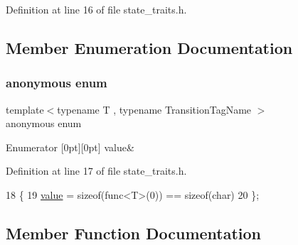 Definition at line 16 of file state\+\_\+traits.\+h.



\subsection{Member Enumeration Documentation}
\mbox{\label{classsmacc_1_1HasSpecificNamedOnExit_aff1a587a8d216597d2dd5b208affc8d0}} 
\subsubsection{\texorpdfstring{anonymous enum}{anonymous enum}}
{\footnotesize\ttfamily template$<$typename T , typename Transition\+Tag\+Name $>$ \\
anonymous enum}

\begin{DoxyEnumFields}{Enumerator}
[0pt][0pt]{}\mbox{\label{classsmacc_1_1HasSpecificNamedOnExit_aff1a587a8d216597d2dd5b208affc8d0a37b1f8de55f442fbc24c211bacfcccf7}} 
value&\\
\hline

\end{DoxyEnumFields}


Definition at line 17 of file state\+\_\+traits.\+h.


\begin{DoxyCode}
18         \{
19             \hyperlink{classsmacc_1_1HasSpecificNamedOnExit_aff1a587a8d216597d2dd5b208affc8d0a37b1f8de55f442fbc24c211bacfcccf7}{value} = \textcolor{keyword}{sizeof}(func<T>(0)) == \textcolor{keyword}{sizeof}(char)
20         \};
\end{DoxyCode}


\subsection{Member Function Documentation}
\mbox{\label{classsmacc_1_1HasSpecificNamedOnExit_aeaaa52aa3aeb9d4c912aa953e020ab50}} 
